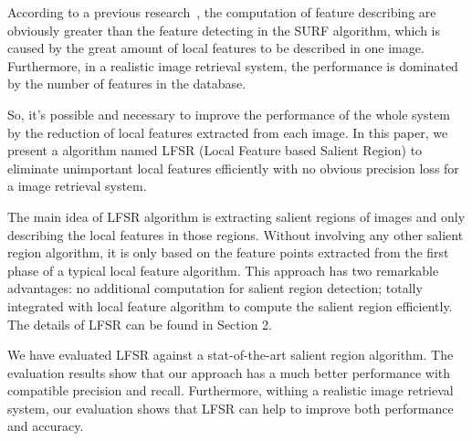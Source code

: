 According to a previous research~\cite{Fang2011ispass}, the computation of feature describing are obviously greater than the feature detecting in the SURF algorithm, which is caused by the great amount of local features to be described in one image. Furthermore, in a realistic image retrieval system, the performance is dominated by the number of features in the database.

So, it's possible and necessary to improve the performance of the whole system by the reduction of local features extracted from each image. In this paper, we present a algorithm named LFSR (Local Feature based Salient Region) to eliminate unimportant local features efficiently with no obvious precision loss for a image retrieval system.

The main idea of LFSR algorithm is extracting salient regions of images and only describing the local features in those regions. Without involving any other salient region algorithm, it is only based on the feature points extracted from the first phase of a typical local feature algorithm. This approach has two remarkable advantages: no additional computation for salient region detection; totally integrated with local feature algorithm to compute the salient region efficiently. The details of LFSR can be found in Section 2. 

We have evaluated LFSR against a stat-of-the-art salient region algorithm. The evaluation results show that our approach has a much better performance with compatible precision and recall. Furthermore, withing a realistic image retrieval system, our evaluation shows that LFSR can help to improve both performance and accuracy.